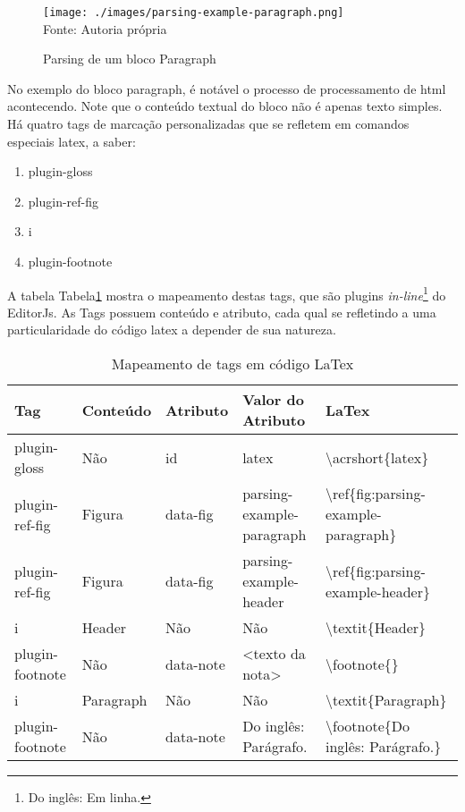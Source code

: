 \begin{figure}[H]
    \centering
    \caption{Parsing de um bloco Paragraph}
    \texttt{[image: ./images/parsing-example-paragraph.png]}
    \label{fig:parsing-example-paragraph} \\
    \textnormal{\fontsize{10pt}{12pt}Fonte: Autoria própria}
\end{figure}

No exemplo do bloco paragraph, é notável o processo de
processamento de
\acrshort{html}
acontecendo. Note que o conteúdo textual do bloco
não é apenas texto simples. Há quatro tags de
marcação personalizadas que se refletem em comandos
especiais
\acrshort{latex}, a saber:

\begin{enumerate}
        
	\item plugin-gloss
	\item plugin-ref-fig
	\item i
	\item plugin-footnote
    
\end{enumerate}

A tabela
Tabela\ref{tbl:plugins-latex-mapping}
mostra o mapeamento destas tags, que são plugins
\textit{in-line}\footnote{Do inglês: Em linha.
}
do EditorJs. As Tags possuem conteúdo e atributo, cada qual se
refletindo a uma particularidade do código
\acrshort{latex}
a depender de sua natureza.

\begin{table}[H]
    \centering
    \caption{Mapeamento de tags em código LaTex}
    \label{tbl:plugins-latex-mapping}
    \renewcommand{\arraystretch}{1.5}
    \begin{tabular}{p{1.92cm} p{1.92cm} p{1.92cm} p{3.2cm} p{7.04cm}}
        \hline
        \textbf{Tag} & \textbf{Conteúdo} & \textbf{Atributo} & \textbf{Valor do Atributo} & \textbf{LaTex} \\
        \hline
        plugin-gloss & Não & id & latex & \textbackslash acrshort\{latex\} \\
		plugin-ref-fig & Figura & data-fig & parsing-example-paragraph & \textbackslash ref\{fig:parsing-example-paragraph\} \\
		plugin-ref-fig & Figura & data-fig & parsing-example-header & \textbackslash ref\{fig:parsing-example-header\} \\
		i & Header & Não & Não & \textbackslash textit\{Header\} \\
		plugin-footnote & Não & data-note & <texto da nota> & \textbackslash footnote\{<texto da nota>\} \\
		i & Paragraph & Não & Não & \textbackslash textit\{Paragraph\} \\
		plugin-footnote & Não & data-note & Do inglês: Parágrafo. & \textbackslash footnote\{Do inglês: Parágrafo.\} \\
        \hline
        
    \end{tabular}
\end{table}

